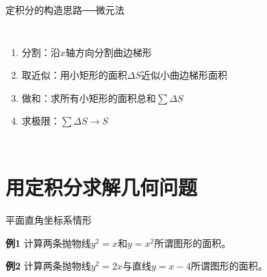\begin{frame}{定积分的构造思路──微元法}
	\linespread{1.2}
	\begin{columns}
		\begin{enumerate}
		  \item {\bb 分割：}沿$x$轴方向分割曲边梯形\pause 
		  \item {\bb 取近似：}用小矩形的面积$\Delta S$近似小曲边梯形面积\pause 
		  \item {\bb 做和：}求所有小矩形的面积总和$\sum \Delta S$\pause 
		  \item {\bb 求极限：}$\sum \Delta S\to S$
		\end{enumerate}
		\begin{center}
		\end{center}
	\end{columns}
\end{frame}

\section{用定积分求解几何问题}

\begin{frame}{平面直角坐标系情形}
	\linespread{1.2}\pause 
	\begin{exampleblock}{{\bf 例1}\hfill}
		计算两条抛物线$y^2=x$和$y=x^2$所谓图形的面积。
	\end{exampleblock}
	\vspace{2em}
	\pause 
	\begin{exampleblock}{{\bf 例2}\hfill}
		计算两条抛物线$y^2=2x$与直线$y=x-4$所谓图形的面积。
	\end{exampleblock}
\end{frame}

